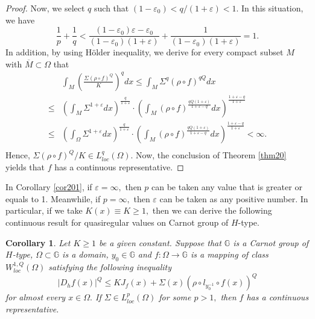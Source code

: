 \documentclass[11pt,twoside]{article}
\newtheorem{cor}[thm]{Corollary}
\theoremstyle{definition}
\theoremstyle{remark}
\begin{document}
\begin{proof}
Now,  we select $q$ such that $(1-\varepsilon_{0})<q/(1+\varepsilon)<1.$ In this situation, we have 
$$\frac{1}{p}+\frac{1}{q}<\frac{(1-\varepsilon_{0})\varepsilon-\varepsilon_{0}}{(1-\varepsilon_{0})(1+\varepsilon)}+\frac{1}{(1-\varepsilon_{0})(1+\varepsilon)}=1.$$ In addition, by using H\"{o}lder inequality, we derive for every compact subset $M$ with  $\overline{M}\subset\Omega$ that 
\begin{equation}
\begin{aligned}
&\int_{M}\left(\frac{\Sigma(\rho\circ f)^{Q}}{K}\right)^{q}dx\leq\int_{M}\Sigma^{q}(\rho\circ f)^{qQ}dx\\
\leq&\left(\int_{M}\Sigma^{1+\varepsilon}dx\right)^{\frac{q}{1+\varepsilon}}\cdot\left(\int_{M}(\rho\circ f)^{\frac{qQ(1+\varepsilon)}{1+\varepsilon-q}}dx\right)^{\frac{1+\varepsilon-q}{1+\varepsilon}}\\
\leq&\left(\int_{\Omega}\Sigma^{1+\varepsilon}dx\right)^{\frac{q}{1+\varepsilon}}\cdot\left(\int_{M}(\rho\circ f)^{\frac{qQ(1+\varepsilon)}{1+\varepsilon-q}}dx\right)^{\frac{1+\varepsilon-q}{1+\varepsilon}}<\infty.\\
\end{aligned}
\end{equation}
Hence, $\Sigma(\rho\circ f)^{Q}/K\in L_{loc}^{q}(\Omega).$ Now, the conclusion of Theorem \ref{thm20} yields  that $f$ has a continuous representative.
\end{proof}

In Corollary \ref{cor201}, if $\varepsilon=\infty,$ then $p$  can be taken any value that is greater or equals to 1. Meanwhile, if $p=\infty,$ then $\varepsilon$ can be taken as any positive number.   
In particular, if we take $K(x)\equiv K\geq1,$ then we can derive the following continuous result for quasiregular values on Carnot group of $H$-type.
\begin{cor}\label{cor20}
Let  $K\geq1$ be a given constant. Suppose that $\mathbb{G}$ is a  Carnot group of $H$-type, $\Omega\subset\mathbb{G}$ is a domain, $y_{0}\in\mathbb{G}$ and $f:\Omega\rightarrow \mathbb{G}$ is a mapping of class $W_{loc}^{1,Q}(\Omega)$ satisfying  the following inequality
$$\vert D_{h}f(x)\vert^{Q}\leq KJ_{f}(x)+\Sigma(x)(\rho\circ l_{y_{0}^{-1}}\circ f(x))^{Q}$$
for almost every $x\in\Omega.$ If  $\Sigma\in L_{loc}^{p}(\Omega)$ for some  $p>1,$
 then $f$ has a continuous representative.
\end{cor}
\end{document}
